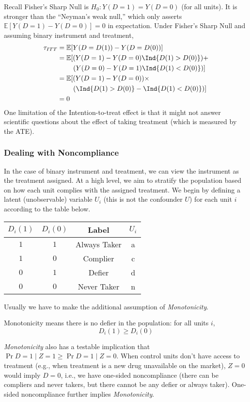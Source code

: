 Recall Fisher's Sharp Null is \(H_0: Y(D = 1) = Y(D = 0)\) (for all units). It is stronger than the ``Neyman's weak null,'' which only asserts $\mathbb{E}[Y(D = 1) - Y(D = 0)] = 0$ in expectation. Under Fisher's Sharp Null and assuming binary instrument and treatment,
\begin{align*}
    \tau_{ITT} &= \mathbb{E}[Y(D = D(1)) - Y(D = D(0))] \\
    &= \mathbb{E}[(Y(D = 1) - Y(D = 0) \Ind\{D(1) > D(0)\}) + \\
    &~~~~~~~(Y(D = 0) - Y(D = 1) \Ind\{D(1) < D(0)\})] \\ 
    &= \mathbb{E}[(Y(D = 1) - Y(D = 0)) \times \\
    &~~~~~~~(\Ind\{D(1) > D(0)\} - \Ind\{D(1) < D(0)\})] \\
    &= 0
\end{align*}
One limitation of the Intention-to-treat effect is that it might not answer scientific questions about the effect of taking treatment (which is measured by the ATE). 

\subsubsection{Dealing with Noncompliance}
In the case of binary instrument and treatment, we can view the instrument as the treatment assigned. At a high level, we aim to stratify the population based on how each unit complies with the assigned treatment. We begin by defining a latent (unobservable) variable \(U_i\) (this is not the confounder \(U\)) for each unit \(i\) according to the table below. 

\begin{table}[h]
    \centering
    \begin{tabular}{|c|c|c|c|}
        \hline
        \(D_i(1)\) & \(D_i(0)\) & Label & \(U_i\) \\
        \hline
        \( 1 \) & \( 1 \) & Always Taker & a \\
        \( 1 \) & \( 0 \) & Complier & c \\
        \( 0 \) & \( 1 \) & Defier & d \\
        \( 0 \) & \( 0 \) & Never Taker & n \\
        \hline
    \end{tabular}
\end{table}

Usually we have to make the additional assumption of \textit{Monotonicity}.
\begin{assumption}
    Monotonicity means there is no defier in the population: for all units \(i\), \[D_i(1) \geq D_i(0)\]
\end{assumption}
\textit{Monotonicity} also has a testable implication that \(\Pr{D = 1 \mid Z = 1} \geq \Pr{D = 1 \mid Z = 0}\). When control units don't have access to treatment (e.g., when treatment is a new drug unavailable on the market), \(Z = 0\) would imply \(D = 0\), i.e., we have one-sided noncompliance (there can be compliers and never takers, but there cannot be any defier or always taker). One-sided noncompliance further implies \textit{Monotonicity}.

